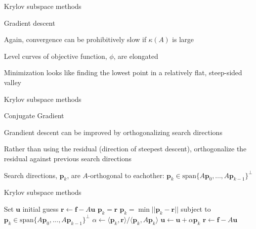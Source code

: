 \documentclass[18pt,xcolor=table]{beamer}
\begin{document}
\begin{frame}{Krylov subspace methods}
\begin{block}{Gradient descent}
\bit
\item Again, convergence can be prohibitively slow if $\kappa(A)$ is large
\item Level curves of objective function, $\phi$, are elongated
\item Minimization looks like finding the lowest point in a relatively flat, steep-sided valley
\eit
\end{block}
\end{frame}

\begin{frame}{Krylov subspace methods}
\begin{block}{Conjugate Gradient}
\bit
\item Grandient descent can be improved by orthogonalizing search directions
\item Rather than using the residual (direction of steepest descent), orthogonalize the residual against previous search directions
\item Search directions, $\mathbf{p}_k$, are $A$-orthogonal to eachother: $\mathbf{p}_k\in\text{span}\{A\mathbf{p}_0,...,A\mathbf{p}_{k-1}\}^\perp$
\eit
\end{block}
\end{frame}

\begin{frame}{Krylov subspace methods}
\begin{algorithm}[H]
\caption{Conjugate Gradient (idea)}
\begin{algorithmic}
\State Set $\mathbf{u}$ initial guess
\State $\mathbf{r} \leftarrow \mathbf{f} - A\mathbf{u}$
\State $\mathbf{p}_k = \mathbf{r}$
\Else
\State $\mathbf{p}_k = \min||\mathbf{p}_k - \mathbf{r}||$ subject to $\mathbf{p}_k\in\text{span}\{A\mathbf{p}_0,...,A\mathbf{p}_{k-1}\}^\perp$
\EndIf
\State $\alpha \leftarrow \langle \mathbf{p}_k, \mathbf{r} \rangle / \langle \mathbf{p}_k, A\mathbf{p}_k \rangle$
\State $\mathbf{u} \leftarrow \mathbf{u} + \alpha\mathbf{p}_k$
\State $\mathbf{r} \leftarrow \mathbf{f} - A\mathbf{u}$
\EndFor
\end{algorithmic}
\end{algorithm}
\end{frame}
\end{document}
